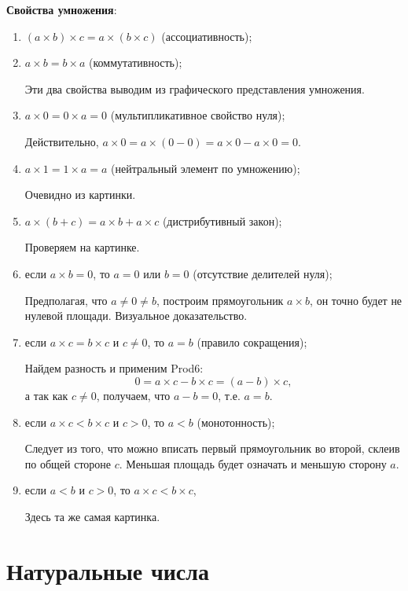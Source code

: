 \textbf{Свойства умножения}:
\begin{enumerate}[label=P\arabic*]
\item $(a\times b)\times c = a\times (b\times c)$ (ассоциативность);
\item $a\times b=b\times a$ (коммутативность);

Эти два свойства выводим из графического представления умножения.

\item $a\times 0=0\times a=0$ (мультипликативное свойство нуля);

Действительно, $a\times 0 = a\times (0-0) = a\times 0 - a\times 0 = 0$.

\item $a\times 1=1\times a=a$ (нейтральный элемент по умножению);

Очевидно из картинки.

\item $a\times(b+c)=a\times b+a\times c$ (дистрибутивный закон);

Проверяем на картинке.
\item если $a\times b=0$, то $a=0$ или $b=0$ (отсутствие делителей нуля);

Предполагая, что $a\ne0\ne b$, построим прямоугольник $a\times b$, он точно будет не нулевой площади. Визуальное доказательство.

\item если $a\times c=b\times c$ и $c\ne 0$, то $a=b$ (правило сокращения);

Найдем разность и применим Prod6:
$$
0 = a\times c-b\times c = (a-b)\times c,
$$
а так как $c\ne 0$, получаем, что $a-b=0$, т.е. $a=b$.

\item если $a\times c<b\times c$ и $c>0$, то $a<b$ (монотонность);

Следует из того, что можно вписать первый прямоугольник во второй, склеив по общей стороне $c$. Меньшая площадь будет означать и меньшую сторону $a$.
\item если $a<b$ и $c>0$, то $a\times c<b\times c$,

Здесь та же самая картинка.
\end{enumerate}


\section{Натуральные числа}



